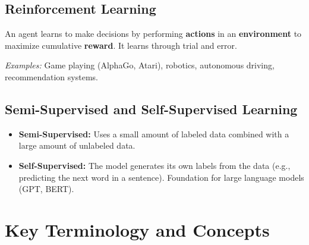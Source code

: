 \documentclass[11pt,a4paper]{article}
\begin{document}
\subsection{Reinforcement Learning}
\begin{definitionbox}
An agent learns to make decisions by performing \textbf{actions} in an \textbf{environment} to maximize cumulative \textbf{reward}. It learns through trial and error.
\end{definitionbox}

\begin{center}
\end{center}
\smallskip
\textit{Examples:} Game playing (AlphaGo, Atari), robotics, autonomous driving, recommendation systems.

\subsection{Semi-Supervised and Self-Supervised Learning}
\begin{itemize}[leftmargin=*]
  \item \textbf{Semi-Supervised:} Uses a small amount of labeled data combined with a large amount of unlabeled data.
  \item \textbf{Self-Supervised:} The model generates its own labels from the data (e.g., predicting the next word in a sentence). Foundation for large language models (GPT, BERT).
\end{itemize}

\section{Key Terminology and Concepts}
\end{document}
